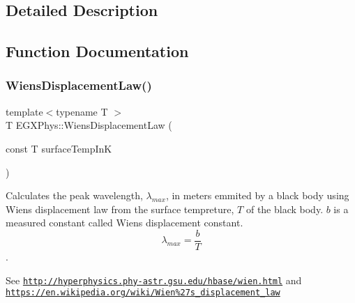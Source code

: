 \subsection{Detailed Description}


\subsection{Function Documentation}
\mbox{\label{group___e_g_x_phys-_electrodynamics-_black_body-_wiens_displacement_law_ga8f89ce1baac45a1717f604255d04af44}} 
\subsubsection{\texorpdfstring{Wiens\+Displacement\+Law()}{WiensDisplacementLaw()}}
{\footnotesize\ttfamily template$<$typename T $>$ \\
T E\+G\+X\+Phys\+::\+Wiens\+Displacement\+Law (\begin{DoxyParamCaption}\item[{const T}]{surface\+Temp\+InK }\end{DoxyParamCaption})}



Calculates the peak wavelength, $\lambda_{max}$, in meters emmited by a black body using Wien\textquotesingle{}s displacement law from the surface tempreture, $T$ of the black body. $b$ is a measured constant called Wien\textquotesingle{}s displacement constant. \[\lambda_{max} = \dfrac{b}{T} \]. 

See \href{http://hyperphysics.phy-astr.gsu.edu/hbase/wien.html}{\tt http\+://hyperphysics.\+phy-\/astr.\+gsu.\+edu/hbase/wien.\+html} and \href{https://en.wikipedia.org/wiki/Wien%27s_displacement_law}{\tt https\+://en.\+wikipedia.\+org/wiki/\+Wien\%27s\+\_\+displacement\+\_\+law}


